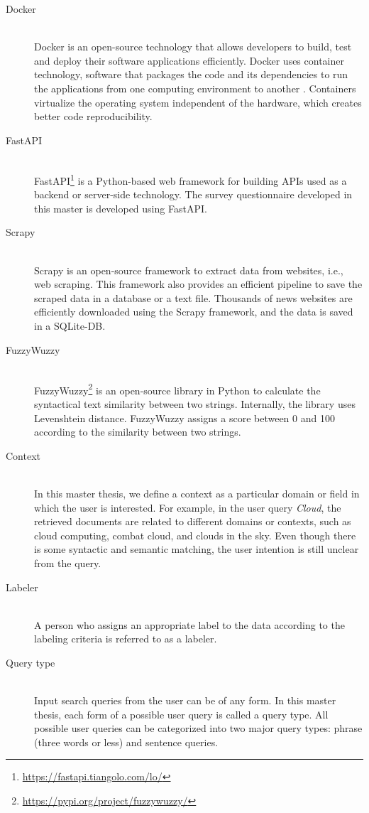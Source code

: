 \begin{description}
	\item[Docker] \hfill \\ Docker is an open-source technology that allows developers to build, test and
	deploy their software applications efficiently. Docker uses container technology, software that packages the code and its dependencies to run the applications from one
	computing environment to another \cite{dockerWhatContainer}. Containers virtualize the operating
	system independent of the hardware, which creates better code reproducibility.  
	
	\item[FastAPI] \hfill \\ FastAPI\footnote{\url{https://fastapi.tiangolo.com/lo/}} is a Python-based web framework for building APIs used as a
	backend or server-side technology. The survey questionnaire developed in this master is
	developed using FastAPI.
	
	\item[Scrapy] \hfill \\ Scrapy is an open-source framework to extract data from websites, i.e., web scraping. This framework also provides an efficient pipeline to save the scraped data in a database or a text file. Thousands of news websites are efficiently downloaded using the Scrapy framework, and the data is saved in a SQLite-DB.
	
	 \item[FuzzyWuzzy] \hfill \\ FuzzyWuzzy\footnote{\url{https://pypi.org/project/fuzzywuzzy/}} is an open-source library in Python to calculate the syntactical text similarity between two strings. Internally, the library uses Levenshtein distance. FuzzyWuzzy assigns a score between 0 and 100 according to the similarity between two strings.
	
	\item[Context] \hfill \\ In this master thesis, we define a context as a particular domain or field in which the user is interested. For example, in the user query \textit{Cloud}, the retrieved documents are related to different domains or contexts, such as cloud computing, combat cloud, and clouds in the sky. Even though there is some syntactic and semantic matching, the user intention is still unclear from the query.
	
	\item[Labeler] \hfill \\ A person who assigns an appropriate label to the data according to the labeling criteria is referred to as a labeler.
	
	\item[Query type] \hfill \\ Input search queries from the user can be of any form. In this master thesis, each form of a possible user query is called a query type. All possible user queries can be categorized into two major query types: phrase (three words or less) and sentence queries.
	
	
\end{description}


